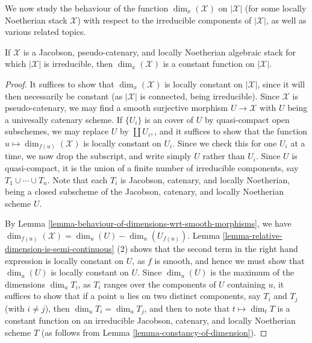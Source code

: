 \noindent
We now study the behaviour of the function $\dim_x(\mathcal{X})$ on
$|\mathcal{X}|$
(for some locally Noetherian stack $\mathcal{X}$) with respect to the
irreducible
components of $|\mathcal{X}|$, as well as various
related topics.

\begin{lemma}
\label{lemma-irreducible-implies-equidimensional}
If $\mathcal{X}$ is
a Jacobson, pseudo-catenary, and locally Noetherian  algebraic stack
for which $|\mathcal{X}|$ is irreducible,
then $\dim_x(\mathcal{X})$ is a constant function on $|\mathcal{X}|$.
\end{lemma}

\begin{proof}
It suffices to show that $\dim_x(\mathcal{X})$ is locally constant on
$|\mathcal{X}|$,
since it will then necessarily be constant (as $|\mathcal{X}|$ is connected,
being irreducible).  Since $\mathcal{X}$ is pseudo-catenary,
we may find a smooth surjective morphism $U \to \mathcal{X}$ with $U$
being a univesally catenary scheme.  If $\{U_i\}$ is an
cover of $U$ by quasi-compact open subschemes, we may replace
$U$ by $\coprod U_i,$, and
it suffices to show that
the function $u \mapsto \dim_{f(u)}(\mathcal{X})$ is locally constant on $U_i$.
Since we check this for one $U_i$ at a time, we now drop the subscript,
and write simply $U$ rather than $U_i$.
Since $U$ is quasi-compact, it
is the union of a finite number of irreducible components,
say $T_1 \cup \cdots \cup T_n$.  Note that each $T_i$ is Jacobson,
catenary, and locally Noetherian,
being a closed subscheme of the Jacobson, catenary, and locally Noetherian
scheme $U$.

\medskip\noindent
By Lemma \ref{lemma-behaviour-of-dimensions-wrt-smooth-morphisms}, we have
$\dim_{f(u)}(\mathcal{X}) = \dim_{u}(U) - \dim_{u}(U_{f(u)}).$
Lemma \ref{lemma-relative-dimension-is-semi-continuous} (2)
shows that the second term in the right hand expression is locally
constant on $U$, as $f$ is smooth,
and hence we must show that $\dim_u(U)$
is locally constant on $U$.  Since $\dim_u(U)$ is the maximum
of the dimensions $\dim_u T_i$, as $T_i$ ranges over the components
of $U$ containing $u$, it suffices to show
that if a point $u$ lies on two distinct components,
say $T_i$ and $T_j$ (with $i \neq j$),
then $\dim_u T_i = \dim_u T_j$,
and then to note that $t\mapsto \dim_t T$ is a constant
function on an irreducible Jacobson,
catenary, and locally Noetherian scheme $T$
(as follows from Lemma \ref{lemma-constancy-of-dimension}).


\end{proof}
